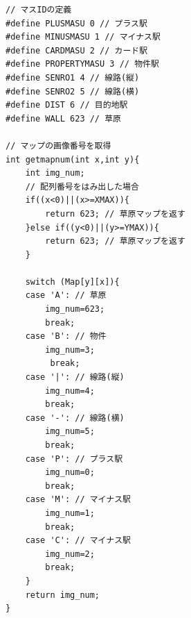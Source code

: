 \documentclass[a4j]{jarticle}
\begin{document}
        \begin{lstlisting}[basicstyle=\ttfamily\footnotesize, frame=single,label=getmapnum,caption=getmapnum関数]
// マスIDの定義
#define PLUSMASU 0 // プラス駅
#define MINUSMASU 1 // マイナス駅
#define CARDMASU 2 // カード駅
#define PROPERTYMASU 3 // 物件駅
#define SENRO1 4 // 線路(縦)
#define SENRO2 5 // 線路(横)
#define DIST 6 // 目的地駅
#define WALL 623 // 草原

// マップの画像番号を取得
int getmapnum(int x,int y){
    int img_num;
    // 配列番号をはみ出した場合
    if((x<0)||(x>=XMAX)){ 
        return 623; // 草原マップを返す
    }else if((y<0)||(y>=YMAX)){
        return 623; // 草原マップを返す
    }

    switch (Map[y][x]){
    case 'A': // 草原
        img_num=623;
        break;
    case 'B': // 物件
        img_num=3;
         break;
    case '|': // 線路(縦)
        img_num=4;
        break; 
    case '-': // 線路(横)
        img_num=5;
        break;
    case 'P': // プラス駅
        img_num=0;
        break;
    case 'M': // マイナス駅
        img_num=1;
        break;
    case 'C': // マイナス駅
        img_num=2;
        break;
    }
    return img_num;
}
        \end{lstlisting}
\end{document}
